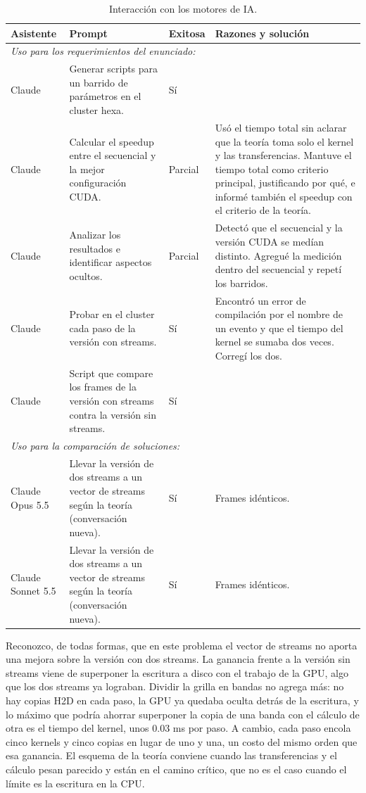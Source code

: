 \begin{table}[H]
  \centering
  \small
  \begin{tabular}{p{1.5cm}p{5.5cm}p{1.4cm}p{6cm}}
    \toprule
    Asistente & Prompt & Exitosa & Razones y solución \\
    \midrule
    \multicolumn{4}{l}{\textit{Uso para los requerimientos del enunciado:}} \\
    \midrule
    Claude & Generar scripts para un barrido de parámetros en el cluster hexa. & Sí & \\
    Claude & Calcular el speedup entre el secuencial y la mejor configuración CUDA. & Parcial & Usó el tiempo total sin aclarar que la teoría toma solo el kernel y las transferencias. Mantuve el tiempo total como criterio principal, justificando por qué, e informé también el speedup con el criterio de la teoría. \\
    Claude & Analizar los resultados e identificar aspectos ocultos. & Parcial & Detectó que el secuencial y la versión CUDA se medían distinto. Agregué la medición dentro del secuencial y repetí los barridos. \\
    Claude & Probar en el cluster cada paso de la versión con streams. & Sí & Encontró un error de compilación por el nombre de un evento y que el tiempo del kernel se sumaba dos veces. Corregí los dos. \\
    Claude & Script que compare los frames de la versión con streams contra la versión sin streams. & Sí & \\
    \midrule
    \multicolumn{4}{l}{\textit{Uso para la comparación de soluciones:}} \\
    \midrule
    Claude Opus 5.5 & Llevar la versión de dos streams a un vector de streams según la teoría (conversación nueva). & Sí & Frames idénticos. \\
    Claude Sonnet 5.5 & Llevar la versión de dos streams a un vector de streams según la teoría (conversación nueva). & Sí & Frames idénticos. \\
    \bottomrule
  \end{tabular}
  \caption{Interacción con los motores de IA.}
  \label{tab:ia}
\end{table}

Reconozco, de todas formas, que en este problema el vector de streams no aporta una mejora sobre la versión con dos streams. La ganancia frente a la versión sin streams viene de superponer la escritura a disco con el trabajo de la GPU, algo que los dos streams ya lograban. Dividir la grilla en bandas no agrega más: no hay copias H2D en cada paso, la GPU ya quedaba oculta detrás de la escritura, y lo máximo que podría ahorrar superponer la copia de una banda con el cálculo de otra es el tiempo del kernel, unos 0.03 ms por paso. A cambio, cada paso encola cinco kernels y cinco copias en lugar de uno y una, un costo del mismo orden que esa ganancia. El esquema de la teoría conviene cuando las transferencias y el cálculo pesan parecido y están en el camino crítico, que no es el caso cuando el límite es la escritura en la CPU.